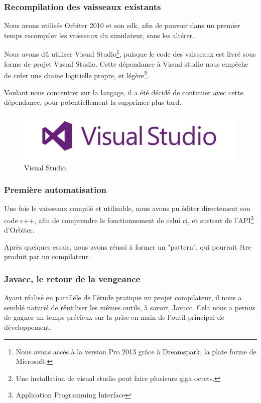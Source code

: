 \documentclass[a4paper,11pt]{article}
\begin{document}
    \subsubsection{Recompilation des vaisseaux existants}
        Nous avons utilisés Orbiter 2010 et son sdk, afin de pouvoir dans un premier temps recompiler les vaisseaux du simulateur, sans les altérer.

        Nous avons dû utiliser Visual Studio\footnote{Nous avons accès à la version Pro 2013 grâce à Dreamspark, la plate forme de Microsoft.}, puisque le code des vaisseaux est livré sous forme de projet Visual Studio. Cette dépendance à Visual studio nous empêche de créer une chaine logicielle propre, et légère\footnote{Une installation de visual studio peut faire plusieurs giga octets.}.

        Voulant nous concentrer sur la langage, il a été décidé de continuer avec cette dépendance, pour potentiellement la supprimer plus tard.
				
				\begin{figure}[!h]
            \begin{center}
                \includegraphics[width=1\textwidth]{img/visual-studio-logo.jpg}
                \caption{Visual Studio}
            \end{center}
        \end{figure}

    \subsubsection{Première automatisation}
        Une fois le vaisseaux compilé et utilisable, nous avons pu éditer directement son code c++, afin de comprendre le fonctionnement de celui ci, et surtout de l'API\footnote{Application Programming Interface} d'Orbiter.

        Après quelques essais, nous avons réussi à former un "pattern", qui pourrait être produit par un compilateur.

    \subsubsection{Javacc, le retour de la vengeance}
        Ayant réalisé en parallèle de l'étude pratique un projet compilateur, il nous a semblé naturel de réutiliser les mêmes outils, à savoir, Javacc. Cela nous a permis de gagner un temps précieux sur la prise en main de l'outil principal de développement.
\end{document}
